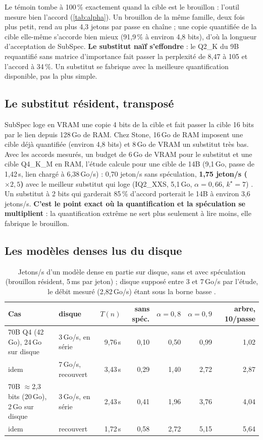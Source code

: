 Le témoin tombe à 100\,\% exactement quand la cible est le brouillon : l'outil mesure bien l'accord (\cref{tab:alpha}). Un brouillon de la même famille, deux fois plus petit, rend au plus 4,3 jetons par passe en chaîne ; une copie quantifiée de la cible elle-même s'accorde bien mieux (91,9\,\% à environ 4,8 bits), d'où la longueur d'acceptation de SubSpec. \textbf{Le substitut naïf s'effondre} : le Q2\_K du 9B requantifié sans matrice d'importance fait passer la perplexité de 8,47 à 105 et l'accord à 34\,\%. Un substitut se fabrique avec la meilleure quantification disponible, pas la plus simple.

\subsection{Le substitut résident, transposé}

SubSpec loge en VRAM une copie 4 bits de la cible et fait passer la cible 16 bits par le lien depuis 128\,Go de RAM. Chez Stone, 16\,Go de RAM imposent une cible déjà quantifiée (environ 4,8 bits) et 8\,Go de VRAM un substitut très bas. Avec les accords mesurés, un budget de 6\,Go de VRAM pour le substitut et une cible Q4\_K\_M en RAM, l'étude calcule pour une cible de 14B (9,1\,Go, passe de 1,42\,s, lien chargé à 6,38\,Go/s) : 0,70 jeton/s sans spéculation, \textbf{1,75 jeton/s ($\times 2{,}5$)} avec le meilleur substitut qui loge (IQ2\_XXS, 5,1\,Go, $\alpha = 0{,}66$, $k^\star = 7$) \calc. Un substitut à 2 bits qui garderait 85\,\% d'accord porterait le 14B à environ 3,6 jetons/s. \textbf{C'est le point exact où la quantification et la spéculation se multiplient} : la quantification extrême ne sert plus seulement à lire moins, elle fabrique le brouillon.

\subsection{Les modèles denses lus du disque}

\begin{table}[ht]
\centering\small
\caption[Spéculation et modèles denses lus du disque]{Jetons/s d'un modèle dense en partie sur disque, sans et avec spéculation (brouillon résident, 5\,ms par jeton) ; disque supposé entre 3 et 7\,Go/s par l'étude, le débit mesuré (2,82\,Go/s) étant sous la borne basse \calc.}
\label{tab:spec-denses}
\begin{tabular}{@{}llrrrrr@{}}
\toprule
Cas & disque & $T(n)$ & sans spéc. & $\alpha=0{,}8$ & $\alpha=0{,}9$ & arbre, 10/passe \\
\midrule
70B Q4 (42\,Go), 24\,Go sur disque & 3\,Go/s, en série & 9,76\,s & 0,10 & 0,50 & 0,99 & 1,02 \\
idem & 7\,Go/s, recouvert & 3,43\,s & 0,29 & 1,40 & 2,72 & 2,87 \\
70B $\approx$2,3 bits (20\,Go), 2\,Go sur disque & 3\,Go/s, en série & 2,43\,s & 0,41 & 1,96 & 3,76 & 4,04 \\
idem & recouvert & 1,72\,s & 0,58 & 2,72 & 5,15 & 5,64 \\
\bottomrule
\end{tabular}
\end{table}

